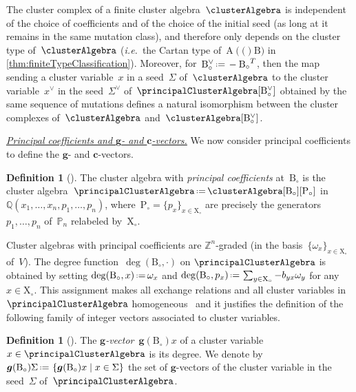 \documentclass{amsart}
\theoremstyle{definition}
\newtheorem{definition}[theorem]{Definition}
\newcommand{\Q}{\mathbb{Q}} %
\newcommand{\Z}{\mathbb{Z}} %
\renewcommand{\b}[1]{{\boldsymbol{#1}}} %
\newcommand{\set}[2]{\left\{ #1 \;\middle|\; #2 \right\}} %
\newcommand{\eqdef}{\mbox{\,\raisebox{0.2ex}{\scriptsize\ensuremath{\mathrm:}}\ensuremath{=}\,}} %
\newcommand{\transpose}[1]{{#1}^T} %
\newcommand{\ie}{\textit{i.e.}~} %
\newcommand{\darkblue}{\color{darkblue}} %
\newcommand{\defn}[1]{\textsl{\darkblue #1}} %
\newcommand{\para}[1]{\medskip\noindent\uline{\textit{#1.}}} %
\newcommand{\gvector}[1]{\b{g}(#1)} %
\newcommand{\gvectors}[1]{\b{g}(#1)} %
\newcommand{\Trop}[1]{\mathbb{P}_{#1}} %
\newcommand{\seed}{\Sigma} %
\newcommand{\cluster}{\mathrm{X}} %
\newcommand{\coefficients}{\mathrm{P}} %
\newcommand{\B}{\mathrm{B}} %
\newcommand{\A}[1]{\mathrm{A}({#1})} %
\newcommand{\fundamentalWeight}{\omega} %
\begin{document}
The cluster complex of a finite cluster algebra~$\clusterAlgebra$ is independent of the choice of coefficients and of the choice of the initial seed (as long at it remains in the same mutation class), and therefore only depends on the cluster type of~$\clusterAlgebra$ (\ie the Cartan type of~$\A(\B)$ in \cref{thm:finiteTypeClassification}).
Moreover, for~$\B_\circ^\vee \eqdef -\transpose{\B_\circ}$, then the map sending a cluster variable~$x$ in a seed~$\seed$ of~$\clusterAlgebra$ to the cluster variable~$x^\vee$ in the seed~$\seed^\vee$ of~$\principalClusterAlgebra[\B_\circ^\vee]$ obtained by the same sequence of mutations defines a natural isomorphism between the cluster complexes of~$\clusterAlgebra$ and~$\clusterAlgebra[\B_\circ^\vee]$.

\para{Principal coefficients and $\b{g}$- and $\b{c}$-vectors}
%
We now consider principal coefficients to define the $\b{g}$- and $\b{c}$-vectors.

\begin{definition}[{\cite[Definition~3.1]{FominZelevinsky-ClusterAlgebrasIV}}]
The cluster algebra with \defn{principal coefficients} at~$\B_\circ$ is the cluster algebra~$\principalClusterAlgebra \eqdef \clusterAlgebra[\B_\circ][\coefficients_\circ]$ in~$\Q(x_1, \dots, x_n, p_1, \dots, p_n)$, where~$\coefficients_\circ = \{p_x\}_{x \in \cluster_\circ}$ are precisely the generators~$p_1, \dots, p_n$ of~$\Trop{n}$ relabeled by~$\cluster_\circ$.
\end{definition}

Cluster algebras with principal coefficients are $\Z^n$-graded (in the basis~$\{\omega_x\}_{x \in \cluster_\circ}$ of~$V$).
The degree function~$\deg(\B_\circ,\cdot)$ on $\principalClusterAlgebra$ is obtained by setting
\(
\deg(\B_\circ,  x) \eqdef \fundamentalWeight_x
\)
and
\(
\deg(\B_\circ, p_x) \eqdef \sum_{y \in \cluster_\circ} -b_{yx} \fundamentalWeight_y
\)
for any $x\in\cluster_\circ$.
This assignment makes all exchange relations and all cluster variables in~$\principalClusterAlgebra$ homogeneous~\cite{FominZelevinsky-ClusterAlgebrasIV} and it justifies the definition of the following family of integer vectors associated to cluster variables.

\begin{definition}[\cite{FominZelevinsky-ClusterAlgebrasIV}]
The \defn{$\b{g}$-vector}~$\gvector{\B_\circ}{x}$ of a cluster variable~$x \in \principalClusterAlgebra$ is its degree.
We denote by $\gvectors{\B_\circ}{\seed} \eqdef \set{\gvector{\B_\circ}{x}}{x \in \seed}$ the set of $\b{g}$-vectors of the cluster variable in the seed~$\seed$ of~$\principalClusterAlgebra$.
\end{definition}
\end{document}
